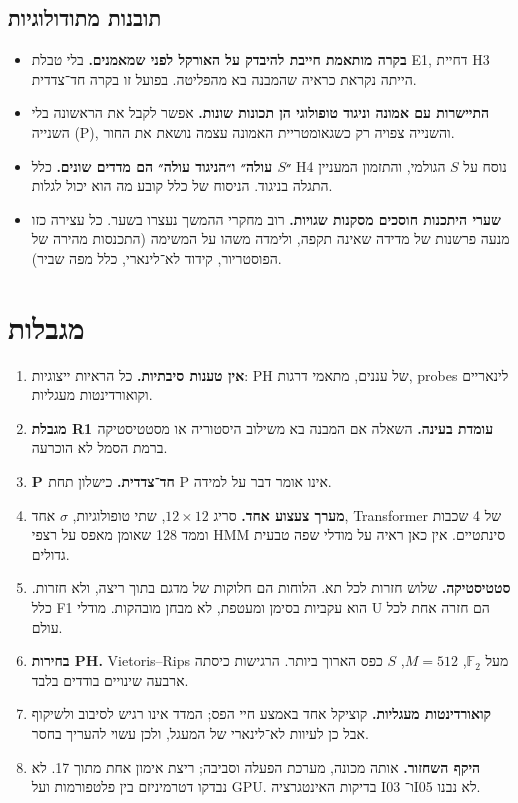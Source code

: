 \documentclass[12pt,a4paper]{article}
\newcommand{\en}[1]{\foreignlanguage{english}{#1}}   %
\newcommand{\chapterbreak}{\clearpage}
\let\oldsection\section
\renewcommand{\section}{\chapterbreak\oldsection}
\begin{document}
\subsection{תובנות מתודולוגיות}
\begin{itemize}[leftmargin=*]
\item \textbf{בקרה מותאמת חייבת להיבדק על האורקל לפני שמאמנים.} בלי טבלת \en{E1}, דחיית H3 הייתה נקראת כראיה שהמבנה בא מהפליטה. בפועל זו בקרה חד־צדדית.
\item \textbf{התיישרות עם אמונה וניגוד טופולוגי הן תכונות שונות.} אפשר לקבל את הראשונה בלי השנייה (P), והשנייה צפויה רק כשגאומטריית האמונה עצמה נושאת את החור.
\item \textbf{״$S$ עולה״ ו״הניגוד עולה״ הם מדדים שונים.} כלל H4 נוסח על $S$ הגולמי, והתזמון המעניין התגלה בניגוד. הניסוח של כלל קובע מה הוא יכול לגלות.
\item \textbf{שערי היתכנות חוסכים מסקנות שגויות.} רוב מחקרי ההמשך נעצרו בשער. כל עצירה כזו מנעה פרשנות של מדידה שאינה תקפה, ולימדה משהו על המשימה (התכנסות מהירה של הפוסטריור, קידוד לא־לינארי, כלל מפה שביר).
\end{itemize}

\section{מגבלות}\label{sec:limits}
\begin{enumerate}[leftmargin=*]
\item \textbf{אין טענות סיבתיות.} כל הראיות ייצוגיות: PH של עננים, מתאמי דרגות, \en{probes} לינאריים וקואורדינטות מעגליות.
\item \textbf{מגבלת R1 עומדת בעינה.} השאלה אם המבנה בא משילוב היסטוריה או מסטטיסטיקה ברמת הסמל לא הוכרעה.
\item \textbf{P חד־צדדית.} כישלון תחת P אינו אומר דבר על למידה.
\item \textbf{מערך צעצוע אחד.} סריג $12\times12$, שתי טופולוגיות, $\sigma$ אחד, \en{Transformer} של 4 שכבות וממד 128 שאומן מאפס על רצפי \en{HMM} סינתטיים. אין כאן ראיה על מודלי שפה טבעית גדולים.
\item \textbf{סטטיסטיקה.} שלוש חזרות לכל תא. הלוחות הם חלוקות של מדגם בתוך ריצה, ולא חזרות. כלל F1 הוא עקביות בסימן ומעטפת, לא מבחן מובהקות. מודלי U הם חזרה אחת לכל עולם.
\item \textbf{בחירות PH.} \en{Vietoris--Rips} מעל $\mathbb{F}_2$, $M=512$, $S$ כפס הארוך ביותר. הרגישות כיסתה ארבעה שינויים בודדים בלבד.
\item \textbf{קואורדינטות מעגליות.} קוציקל אחד באמצע חיי הפס; המדד אינו רגיש לסיבוב ולשיקוף אבל כן לעיוות לא־לינארי של המעגל, ולכן עשוי להעריך בחסר.
\item \textbf{היקף השחזור.} אותה מכונה, מערכת הפעלה וסביבה; ריצת אימון אחת מתוך 17. לא נבדקו דטרמיניזם בין פלטפורמות ועל \en{GPU}. בדיקות האינטגרציה I03 ו־I05 לא נבנו.
\end{enumerate}
\end{document}
